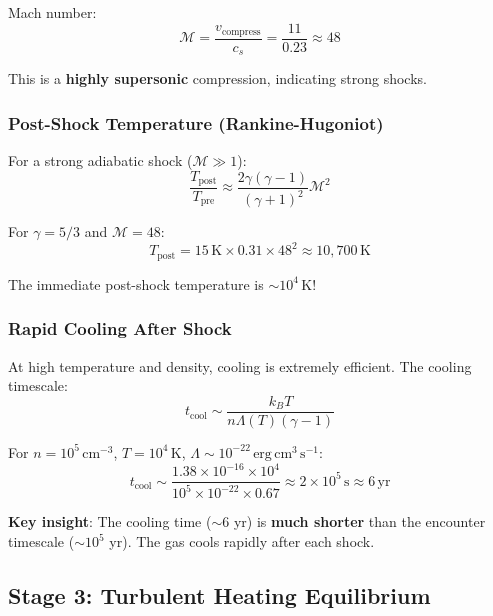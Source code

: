 \documentclass[11pt,a4paper]{article}
\newcommand{\cmcubed}{\,\mathrm{cm^{-3}}}
\begin{document}
Mach number:
\begin{equation}
    \mathcal{M} = \frac{v_\mathrm{compress}}{c_s} = \frac{11}{0.23} \approx 48
\end{equation}

This is a \textbf{highly supersonic} compression, indicating strong shocks.

\subsubsection{Post-Shock Temperature (Rankine-Hugoniot)}
For a strong adiabatic shock ($\mathcal{M} \gg 1$):
\begin{equation}
    \frac{T_\mathrm{post}}{T_\mathrm{pre}} \approx \frac{2\gamma(\gamma-1)}{(\gamma+1)^2} \mathcal{M}^2
\end{equation}

For $\gamma = 5/3$ and $\mathcal{M} = 48$:
\begin{equation}
    T_\mathrm{post} = 15\,\mathrm{K} \times 0.31 \times 48^2 \approx 10{,}700\,\mathrm{K}
\end{equation}

The immediate post-shock temperature is $\sim 10^4\,\mathrm{K}$!

\subsubsection{Rapid Cooling After Shock}
At high temperature and density, cooling is extremely efficient.
The cooling timescale:
\begin{equation}
    t_\mathrm{cool} \sim \frac{k_B T}{n \Lambda(T) (\gamma - 1)}
\end{equation}

For $n = 10^5\cmcubed$, $T = 10^4\,\mathrm{K}$, $\Lambda \sim 10^{-22}\,\mathrm{erg\,cm^3\,s^{-1}}$:
\begin{equation}
    t_\mathrm{cool} \sim \frac{1.38 \times 10^{-16} \times 10^4}{10^5 \times 10^{-22} \times 0.67}
    \approx 2 \times 10^5\,\mathrm{s} \approx 6\,\mathrm{yr}
\end{equation}

\textbf{Key insight}: The cooling time ($\sim 6$ yr) is \textbf{much shorter} than
the encounter timescale ($\sim 10^5$ yr). The gas cools rapidly after each shock.

\subsection{Stage 3: Turbulent Heating Equilibrium}
\end{document}
